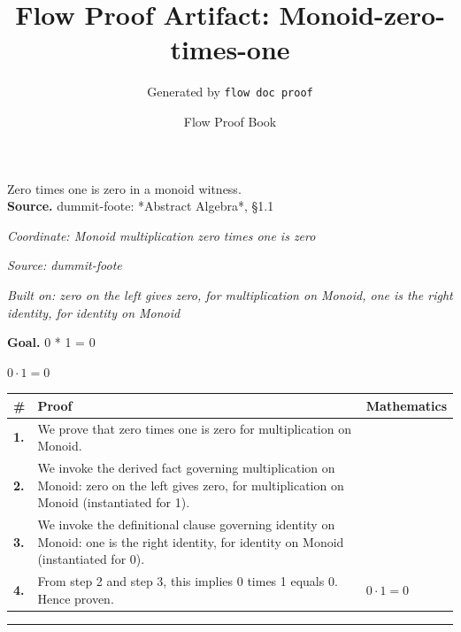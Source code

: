 \documentclass[11pt]{article}
\title{Flow Proof Artifact: Monoid-zero-times-one}
\author{Generated by \texttt{flow doc proof}}
\date{Flow Proof Book}
\theoremstyle{definition}
\begin{document}
\maketitle
Zero times one is zero in a monoid witness.\\[0.5em]
\textbf{Source.} dummit-foote: *Abstract Algebra*, §1.1\\[0.5em]
\bigskip
{}\par
\smallskip\noindent\textit{Coordinate: Monoid \cdot multiplication \cdot zero times one is zero}\par
\smallskip\noindent\textit{Source: dummit-foote}\par
\smallskip\noindent\textit{Built on: zero on the left gives zero, for multiplication on Monoid, one is the right identity, for identity on Monoid}\par
\medskip
\noindent\textbf{Goal.} 0 * 1 = 0\par
\noindent$\displaystyle 0 \cdot 1 = 0$\par
\medskip
\noindent
\begin{tabular}{@{} >{\raggedright\arraybackslash}p{} >{\raggedright\arraybackslash}p{} >{\raggedleft\arraybackslash}p{} @{}}
\textbf{\#} & \textbf{Proof} & \textbf{Mathematics} \\
\midrule
\textbf{1.} & We prove that zero times one is zero for multiplication on Monoid. & \\[0.45em]
\textbf{2.} & We invoke the derived fact governing multiplication on Monoid: zero on the left gives zero, for multiplication on Monoid (instantiated for 1). & \\[0.45em]
\textbf{3.} & We invoke the definitional clause governing identity on Monoid: one is the right identity, for identity on Monoid (instantiated for 0). & \\[0.45em]
\textbf{4.} & From step 2 and step 3, this implies 0 times 1 equals 0. Hence proven. & $\displaystyle 0 \cdot 1 = 0$ \\[0.45em]
\bottomrule
\end{tabular}
\label{thm:Monoid-multiplication-zero_times_one_is_zero}
\par\medskip\hrule
\end{document}
